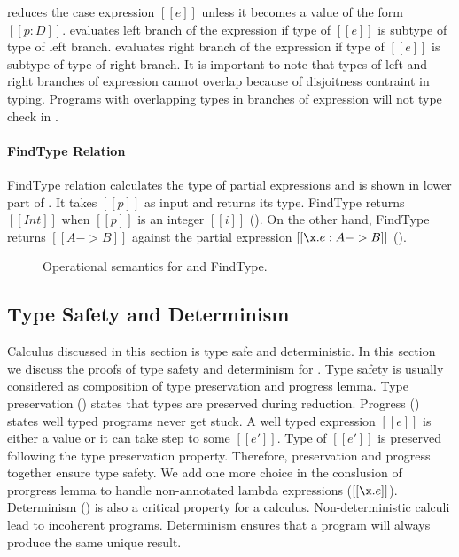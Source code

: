  reduces the case expression $[[e]]$ unless it becomes a value of the form $[[p:D]]$.
 evaluates left branch of the \typeof expression if type of $[[e]]$ is subtype
of type of left branch.
 evaluates right branch of the \typeof expression if type of $[[e]]$ is subtype
of type of right branch.
It is important to note that types of left and right branches of \typeof expression cannot overlap
because of disjoitness contraint in typing. Programs with overlapping types in branches of \typeof
expression will not type check in \cal. 

\paragraph{FindType Relation} FindType relation calculates the type of partial expressions
and is shown in lower part of . It takes $[[p]]$ as input and returns its type.
FindType returns $[[Int]]$ when $[[p]]$ is an integer $[[i]]$ (). On the other hand,
FindType returns $[[A -> B]]$ against the partial expression $[[\x.e : A->B]]$ ().

\begin{figure}[t]
  \begin{small}
    \centering
  \end{small}
  \begin{small}
    \centering
  \end{small}
  \caption{Operational semantics for \cal and FindType.}
  \label{fig:union:os}
\end{figure}


\subsection{Type Safety and Determinism}
\label{sec:union:safety}
Calculus discussed in this section is type safe and deterministic. In this section we discuss the
proofs of type safety and determinism for \cal. Type safety is usually considered as composition
of type preservation and progress lemma. Type preservation () 
states that types are preserved during
reduction. Progress () states well typed programs never get stuck. 
A well typed expression $[[e]]$ is 
either a value or it can take step to some $[[e']]$. Type of $[[e']]$ is preserved following the
type preservation property. Therefore, preservation and progress together ensure type safety.
We add one more choice in the conslusion of prorgress lemma to handle non-annotated lambda expressions 
($[[\x.e]]$). 
Determinism () is also a critical property for a calculus.
Non-deterministic calculi lead to incoherent programs.
Determinism ensures that a program will always produce the same unique result.

